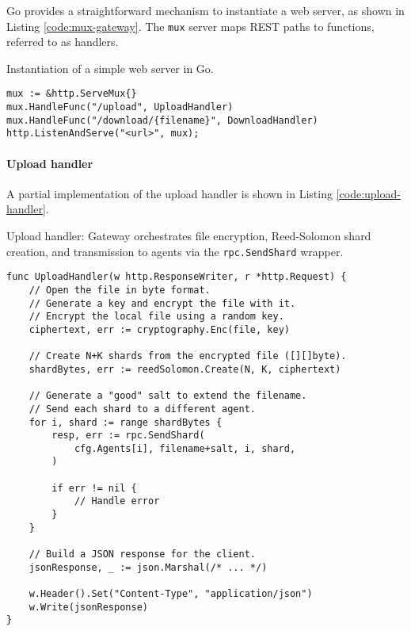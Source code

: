 Go provides a straightforward mechanism to instantiate a web server, as shown in Listing \ref{code:mux-gateway}. The \texttt{mux} server maps REST paths to functions, referred to as handlers. 

\begin{listing}\caption{Instantiation of a simple web server in Go.}

\label{code:mux-gateway}
\begin{verbatim}
mux := &http.ServeMux{}
mux.HandleFunc("/upload", UploadHandler)
mux.HandleFunc("/download/{filename}", DownloadHandler)
http.ListenAndServe("<url>", mux);
\end{verbatim}
\end{listing}


\paragraph{Upload handler}

A partial implementation of the upload handler is shown in Listing \ref{code:upload-handler}.

\begin{listing}
\caption{Upload handler: Gateway orchestrates file encryption, Reed-Solomon shard creation, and transmission to agents via the \texttt{rpc.SendShard} wrapper.}
\label{code:upload-handler}
\begin{verbatim}
func UploadHandler(w http.ResponseWriter, r *http.Request) {
    // Open the file in byte format.
    // Generate a key and encrypt the file with it.
    // Encrypt the local file using a random key.
    ciphertext, err := cryptography.Enc(file, key)
    
    // Create N+K shards from the encrypted file ([][]byte).
    shardBytes, err := reedSolomon.Create(N, K, ciphertext)

    // Generate a "good" salt to extend the filename.
    // Send each shard to a different agent.
    for i, shard := range shardBytes {
        resp, err := rpc.SendShard(
            cfg.Agents[i], filename+salt, i, shard,
        )

        if err != nil {
            // Handle error
        }
    }
    
    // Build a JSON response for the client.
    jsonResponse, _ := json.Marshal(/* ... */)

    w.Header().Set("Content-Type", "application/json")
    w.Write(jsonResponse)
}

\end{verbatim}
\end{listing}

